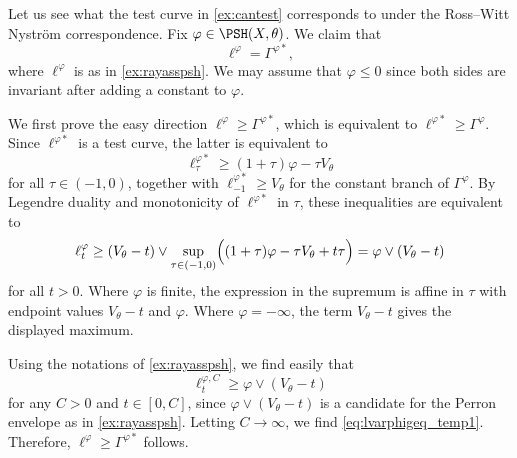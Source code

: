 \begin{example}\label{ex:testcurve:L843}
    Let us see what the test curve in \cref{ex:cantest} corresponds to under the Ross--Witt Nyström correspondence. Fix $\varphi\in \PSH(X,\theta)$.
    We claim that
    \begin{equation}\label{eq:RWNsingtype}
    \ell^{\varphi}=\Gamma^{\varphi*},
    \end{equation}
    where $\ell^{\varphi}$ is as in \cref{ex:rayasspsh}.
    We may assume that $\varphi\leq 0$ since both sides are invariant after adding a constant to $\varphi$.

    We first prove the easy direction $\ell^{\varphi}\geq \Gamma^{\varphi*}$, which is equivalent to $\ell^{\varphi *}\geq \Gamma^{\varphi}$. Since $\ell^{\varphi *}$ is a test curve, the latter is equivalent to
    \[
    \ell^{\varphi*}_{\tau}\geq (1+\tau)\varphi-\tau V_{\theta}
    \]
    for all $\tau\in (-1,0)$, together with $\ell^{\varphi*}_{-1}\geq V_\theta$ for the constant branch of $\Gamma^\varphi$. By Legendre duality and monotonicity of $\ell^{\varphi*}$ in $\tau$, these inequalities are equivalent to
    \begin{equation}\label{eq:lvarphigeq_temp1}
    \ell^{\varphi}_t\geq (V_\theta-t)\lor \sup_{\tau\in (-1,0)} \Bigl((1+\tau)\varphi-\tau V_{\theta}+t\tau\Bigr)=\varphi\lor (V_{\theta}-t)
    \end{equation}
    for all $t>0$. Where $\varphi$ is finite, the expression in the supremum is affine in $\tau$ with endpoint values $V_\theta-t$ and $\varphi$. Where $\varphi=-\infty$, the term $V_\theta-t$ gives the displayed maximum.

    Using the notations of \cref{ex:rayasspsh}, we find easily that
    \[
    \ell^{\varphi,C}_t\geq \varphi\lor (V_{\theta}-t)
    \]
    for any $C>0$ and $t\in [0,C]$, since $\varphi\lor (V_\theta-t)$ is a candidate for the Perron envelope as in \cref{ex:rayasspsh}. Letting $C\to \infty$, we find \eqref{eq:lvarphigeq_temp1}.
    Therefore, $\ell^{\varphi}\geq \Gamma^{\varphi*}$ follows.


\end{example}
